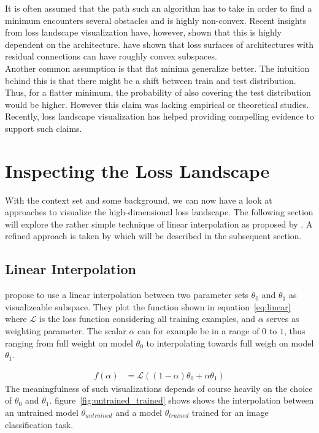 \documentclass[a4paper]{scrartcl}
\begin{document}
It is often assumed that the path such an algorithm has to take in order to find a minimum encounters several obstacles and is highly non-convex. Recent insights from loss landscape visualization have, however, shown that this is highly dependent on the architecture. \citet{li2017visualizing} have shown that loss surfaces of architectures with residual connections can have roughly convex subspaces.\\
Another common assumption is that flat minima generalize better. The intuition behind this is that there might be a shift between train and test distribution. Thus, for a flatter minimum, the probability of also covering the test distribution would be higher. However this claim was lacking empirical or theoretical studies. Recently, loss landscape visualization has helped providing compelling evidence to support such claims.



\section*{Inspecting the Loss Landscape}
With the context set and some background, we can now have a look at approaches to visualize the high-dimensional loss landscape. The following section will explore the rather simple technique of linear interpolation as proposed by \citet{goodfellow2014qualitatively}. A refined approach is taken by \citet{li2017visualizing} which will be described in the subsequent section.



\subsection*{Linear Interpolation}
\citet{goodfellow2014qualitatively} propose to use a linear interpolation between two parameter sets $\theta_0$ and $\theta_1$ as visualizeable subspace. They plot the function shown in equation~\ref{eq:linear} where $\mathcal{L}$ is the loss function considering all training examples, and $\alpha$ serves as weighting parameter. The scalar $\alpha$ can for example be in a range of $0$ to $1$, thus ranging from full weight on model $\theta_0$ to interpolating towards full weigh on model $\theta_1$.

\begin{align}
\label{eq:linear}
	f(\alpha) &= \mathcal{L}((1-\alpha) \theta_0 + \alpha \theta_1)
\end{align}
The meaningfulness of such visualizations depends of course heavily on the choice of $\theta_0$ and $\theta_1$. figure~\ref{fig:untrained_trained} shows shows the interpolation between an untrained model $\theta_{untrained}$ and a model $\theta_{trained}$ trained for an image classification task.
\end{document}
